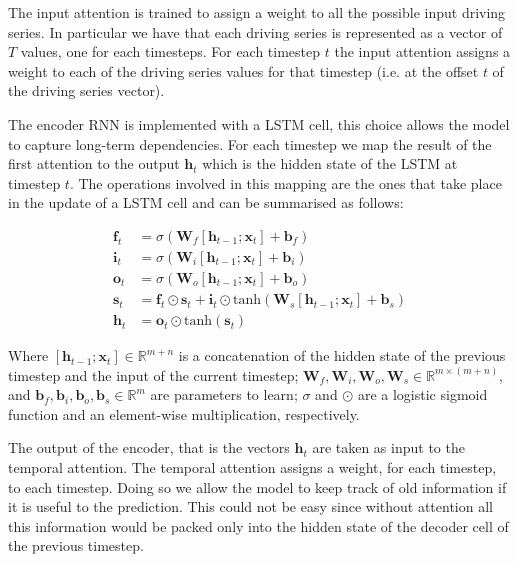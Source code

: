 \documentclass{article}
\begin{document}
The input attention is trained to assign a weight to all the possible input
driving series. In particular we have
that each driving series is represented as a vector of $T$ values, one for each
timesteps. For each timestep $t$ the
input attention assigns a weight to each of the driving series values for that
timestep (i.e. at the offset $t$ of the
driving series vector).

The encoder RNN is implemented with a LSTM cell, this choice allows the model
to capture long-term dependencies.
For each timestep we map the result of the first attention to the output
$\mathbf{h}_t$ which is the hidden state of
the LSTM at timestep $t$. The operations involved in this mapping are the ones
that take place in the update of a LSTM
cell and can be summarised as follows:


\begin{equation} \label{eq:lstm}
\begin{split}
\mathbf{f}_t &= \sigma (\mathbf{W}_f[\mathbf{h}_{t-1};\mathbf{x}_t] +
\mathbf{b}_f) \\
\mathbf{i}_t &= \sigma (\mathbf{W}_i[\mathbf{h}_{t-1};\mathbf{x}_t] +
\mathbf{b}_i) \\
\mathbf{o}_t &= \sigma (\mathbf{W}_o[\mathbf{h}_{t-1};\mathbf{x}_t] +
\mathbf{b}_o) \\
\mathbf{s}_t &= \mathbf{f}_t \odot \mathbf{s}_t + \mathbf{i}_t 
				\odot
\text{tanh}(\mathbf{W}_s[\mathbf{h}_{t-1};\mathbf{x}_t] + \mathbf{b}_s) \\
\mathbf{h}_t &= \mathbf{o}_t \odot \text{tanh}(\mathbf{s}_t)
\end{split}
\end{equation}

Where $[\mathbf{h}_{t-1};\mathbf{x}_t] \in \mathbb{R}^{m + n}$ is a
concatenation of the hidden state of the previous
timestep and the input of the current timestep;
$\mathbf{W}_f,\mathbf{W}_i,\mathbf{W}_o,\mathbf{W}_s
\in \mathbb{R}^{m \times(m+n)}$, and $\mathbf{b}_f, \mathbf{b}_i,
\mathbf{b}_o,\mathbf{b}_s \in \mathbb{R}^m$ are
parameters to learn; $\sigma$ and $\odot$ are a logistic sigmoid function and
an element-wise multiplication,
respectively.

The output of the encoder, that is the vectors $\mathbf{h}_t$ are taken as
input to the temporal attention.
The temporal attention assigns a weight, for each timestep, to each timestep.
Doing so we allow the model to keep
track of old information if it is useful to the prediction. This could not be
easy since without attention all this
information would be packed only into the hidden state of the decoder cell of
the previous timestep.
\end{document}
